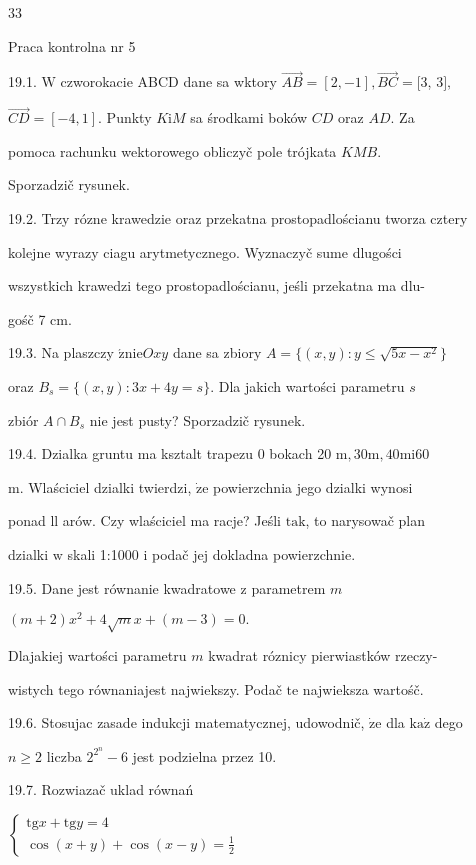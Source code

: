 \documentclass[a4paper,12pt]{article}
\begin{document}
33

Praca kontrolna nr 5

19.1. $\mathrm{W}$ czworokacie ABCD dane sa wktory $\vec{AB}= [2,-1], \vec{BC}= [3$, 3$],$

$\vec{CD}=[-4,1]$. Punkty $K\mathrm{i}M$ sa środkami boków $CD$ oraz $AD$. Za

pomoca rachunku wektorowego obliczyč pole trójkata $KMB.$

Sporzadzič rysunek.

19.2. Trzy rózne krawedzie oraz przekatna prostopadlościanu tworza cztery

kolejne wyrazy ciagu arytmetycznego. Wyznaczyč sume dlugości

wszystkich krawedzi tego prostopadlościanu, jeśli przekatna ma dlu-

gośč 7 cm.

19.3. Na plaszczy $\acute{\mathrm{z}}\mathrm{n}\mathrm{i}\mathrm{e}Oxy$ dane sa zbiory $A = \{(x,y):y\leq\sqrt{5x-x^{2}}\}$

oraz $B_{s} = \{(x,y):3x+4y=s\}$. Dla jakich wartości parametru $s$

zbiór $A\cap B_{s}$ nie jest pusty? Sporzadzič rysunek.

19.4. Dzialka gruntu ma ksztalt trapezu $0$ bokach 20 $\mathrm{m}, 30\mathrm{m}, 40\mathrm{m}\mathrm{i}60$

$\mathrm{m}$. Wlaściciel dzialki twierdzi, $\dot{\mathrm{z}}\mathrm{e}$ powierzchnia jego dzialki wynosi

ponad ll arów. Czy wlaściciel ma racje? Jeśli $\mathrm{t}\mathrm{a}\mathrm{k}$, to narysowač plan

dzialki $\mathrm{w}$ skali 1:1000 $\mathrm{i}$ podač jej dokladna powierzchnie.

19.5. Dane jest równanie kwadratowe $\mathrm{z}$ parametrem $m$

$(m+2)x^{2}+4\sqrt{m}x+(m-3)=0.$

Dlajakiej wartości parametru $m$ kwadrat róznicy pierwiastków rzeczy-

wistych tego równaniajest najwiekszy. Podač $\mathrm{t}\mathrm{e}$ najwieksza wartośč.

19.6. Stosujac zasade indukcji matematycznej, udowodnič, $\dot{\mathrm{z}}\mathrm{e}$ dla $\mathrm{k}\mathrm{a}\dot{\mathrm{z}}$ dego

$n\geq 2$ liczba $2^{2^{n}}-6$ jest podzielna przez 10.

19.7. Rozwiazač uklad równań

$\left\{\begin{array}{l}
\mathrm{t}\mathrm{g}x+\mathrm{t}\mathrm{g}y=4\\
\cos(x+y)+\cos(x-y)=\frac{1}{2}
\end{array}\right.$
\end{document}
